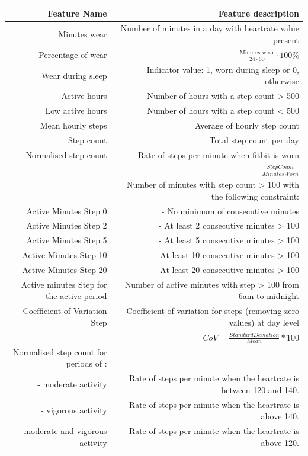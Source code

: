 \documentclass{article}
\begin{document}
\begin{longtable}{  n|d }
\toprule
\cmidrule(r){1-2}
\textbf{Feature Name} & \textbf{Feature description} \\
\hline
\endfirsthead
Minutes wear & Number of minutes in a day with heartrate value present \\
\hline
Percentage of wear & $\frac{\text{Minutes wear}}{24\cdot60}\cdot100\%$\\
\hline
Wear during sleep & Indicator value: 1,  worn during sleep or 0, otherwise \\
\hline
Active hours & Number of hours with a step count > 500  \\
\hline
Low active hours & Number of hours with a step count < 500  \\
\hline
Mean hourly steps & Average of hourly step count \\
\hline
Step count & Total step count per day \\
\hline
Normalised step count & Rate of steps per minute when fitbit is worn \\
 & $\frac{Step Count}{Minutes Worn}$ \\
\hline
 & Number of minutes with step count > 100 with the following constraint: \\
Active Minutes Step 0 & - No minimum of consecutive minutes\\
Active Minutes Step 2 & - At least 2 consecutive minutes > 100 \\
Active Minutes Step 5 & - At least 5 consecutive minutes > 100 \\
Active Minutes Step 10 & - At least 10 consecutive minutes > 100 \\
Active Minutes Step 20 & - At least 20 consecutive minutes > 100 \\
\hline
Active minutes Step for the active period & Number of active minutes with step > 100 from 6am to midnight \\
\hline
Coefficient of Variation Step & Coefficient of variation for steps (removing zero values) at day level \\
 & $CoV = \frac{Standard Deviation}{Mean} * 100$ \\
 \hline
 Normalised step count for periods of : & \\
 - moderate activity & Rate of steps per minute when the heartrate is between 120 and 140. \\ 
 - vigorous activity & Rate of steps per minute when the heartrate is above 140. \\
 - moderate and vigorous activity & Rate of steps per minute when the heartrate is above 120. \\

\end{longtable}
\end{document}
